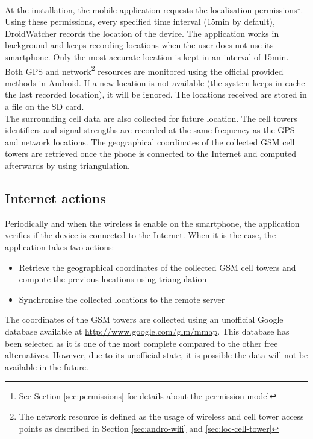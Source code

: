 At the installation, the mobile application requests the localisation permissions\footnote{See Section \ref{sec:permissions} for details about the permission model}.
Using these permissions, every specified time interval (15min by default), DroidWatcher records the location of the device.
The application works in background and keeps recording locations when the user does not use its smartphone.
Only the most accurate location is kept in an interval of 15min.
Both GPS and network\footnote{The network resource is defined as the usage of wireless and cell tower access points as described in Section \ref{sec:andro-wifi} and \ref{sec:loc-cell-tower}} resources are monitored using the official provided methods in Android.
If a new location is not available (the system keeps in cache the last recorded location), it will be ignored.
The locations received are stored in a file on the SD card.\\

The surrounding cell data are also collected for future location.
The cell towers identifiers and signal strengths are recorded at the same frequency as the GPS and network locations.
The geographical coordinates of the collected GSM cell towers are retrieved once the phone is connected to the Internet and computed afterwards by using triangulation.

\subsection{Internet actions}
\label{sec:dw-internet-actions}

Periodically and when the wireless is enable on the smartphone, the application verifies if the device is connected to the Internet.
When it is the case, the application takes two actions:

\begin{itemize}
\item Retrieve the geographical coordinates of the collected GSM cell towers and compute the previous locations using triangulation
\item Synchronise the collected locations to the remote server
\end{itemize}

The coordinates of the GSM towers are collected using an unofficial Google database available at \url{http://www.google.com/glm/mmap}.
This database has been selected as it is one of the most complete compared to the other free alternatives.
However, due to its unofficial state, it is possible the data will not be available in the future.\\


